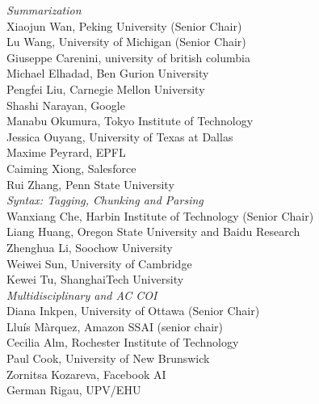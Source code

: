 \emph{Summarization} \\
\hspace*{0.2in} Xiaojun Wan, Peking University (Senior Chair)\\
\hspace*{0.2in} Lu Wang, University of Michigan (Senior Chair)\\
\hspace*{0.2in} Giuseppe Carenini, university of british columbia\\
\hspace*{0.2in} Michael Elhadad, Ben Gurion University\\
\hspace*{0.2in} Pengfei Liu, Carnegie Mellon University\\
\hspace*{0.2in} Shashi Narayan, Google\\
\hspace*{0.2in} Manabu Okumura, Tokyo Institute of Technology\\
\hspace*{0.2in} Jessica Ouyang, University of Texas at Dallas\\
\hspace*{0.2in} Maxime Peyrard, EPFL\\
\hspace*{0.2in} Caiming Xiong, Salesforce\\
\hspace*{0.2in} Rui Zhang, Penn State University\\

\emph{Syntax: Tagging, Chunking and Parsing} \\
\hspace*{0.2in} Wanxiang Che, Harbin Institute of Technology (Senior Chair)\\
\hspace*{0.2in} Liang Huang, Oregon State University and Baidu Research\\
\hspace*{0.2in} Zhenghua Li, Soochow University\\
\hspace*{0.2in} Weiwei Sun, University of Cambridge\\
\hspace*{0.2in} Kewei Tu, ShanghaiTech University\\

\emph{Multidisciplinary and AC COI} \\
\hspace*{0.2in} Diana Inkpen, University of Ottawa (Senior Chair)\\
\hspace*{0.2in} Lluís Màrquez, Amazon SSAI (senior chair)\\
\hspace*{0.2in} Cecilia Alm, Rochester Institute of Technology\\
\hspace*{0.2in} Paul Cook, University of New Brunswick\\
\hspace*{0.2in} Zornitsa Kozareva, Facebook AI\\
\hspace*{0.2in} German Rigau, UPV/EHU\\


